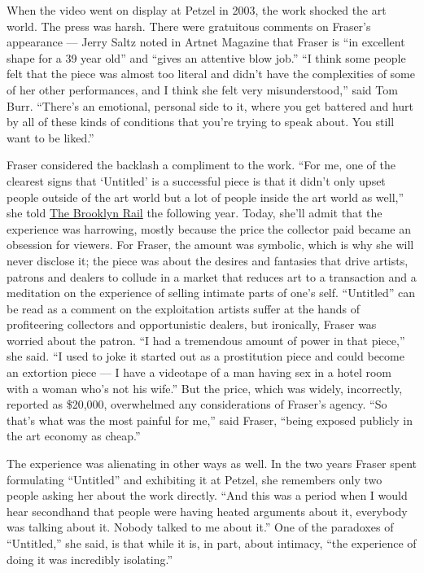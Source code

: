 When the video went on display at Petzel in 2003, the work shocked the
art world. The press was harsh. There were gratuitous comments on
Fraser's appearance --- Jerry Saltz noted in Artnet Magazine that Fraser
is ``in excellent shape for a 39 year old'' and ``gives an attentive
blow job.'' ``I think some people felt that the piece was almost too
literal and didn't have the complexities of some of her other
performances, and I think she felt very misunderstood,'' said Tom Burr.
``There's an emotional, personal side to it, where you get battered and
hurt by all of these kinds of conditions that you're trying to speak
about. You still want to be liked.''

Fraser considered the backlash a compliment to the work. ``For me, one
of the clearest signs that `Untitled' is a successful piece is that it
didn't only upset people outside of the art world but a lot of people
inside the art world as well,'' she told
\href{https://brooklynrail.org/2004/10/art/andrea-fraser}{The Brooklyn
Rail} the following year. Today, she'll admit that the experience was
harrowing, mostly because the price the collector paid became an
obsession for viewers. For Fraser, the amount was symbolic, which is why
she will never disclose it; the piece was about the desires and
fantasies that drive artists, patrons and dealers to collude in a market
that reduces art to a transaction and a meditation on the experience of
selling intimate parts of one's self. ``Untitled'' can be read as a
comment on the exploitation artists suffer at the hands of profiteering
collectors and opportunistic dealers, but ironically, Fraser was worried
about the patron. ``I had a tremendous amount of power in that piece,''
she said. ``I used to joke it started out as a prostitution piece and
could become an extortion piece --- I have a videotape of a man having
sex in a hotel room with a woman who's not his wife.'' But the price,
which was widely, incorrectly, reported as \$20,000, overwhelmed any
considerations of Fraser's agency. ``So that's what was the most painful
for me,'' said Fraser, ``being exposed publicly in the art economy as
cheap.''

The experience was alienating in other ways as well. In the two years
Fraser spent formulating ``Untitled'' and exhibiting it at Petzel, she
remembers only two people asking her about the work directly. ``And this
was a period when I would hear secondhand that people were having heated
arguments about it, everybody was talking about it. Nobody talked to me
about it.'' One of the paradoxes of ``Untitled,'' she said, is that
while it is, in part, about intimacy, ``the experience of doing it was
incredibly isolating.''


